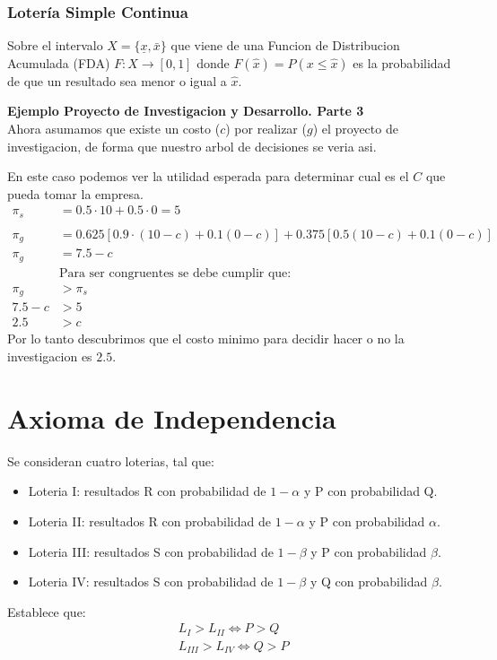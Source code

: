 \documentclass[12pt]{article}
\begin{document}
\subsubsection{Lotería Simple Continua}
Sobre el intervalo $X=\{ {{\underline{x}},\bar{x}}\}$ que viene de una Funcion de Distribucion Acumulada (FDA) $F:X\rightarrow[0,1]$ donde $F(\hat{x})=P(x \leq \hat{x})$ es la probabilidad de que un resultado sea menor o igual a $\hat{x}$. 
\begin{ejemplo}
    \textbf{Ejemplo Proyecto de Investigacion y Desarrollo. Parte 3}\\
    Ahora asumamos que existe un costo ($c$) por realizar ($g$) el proyecto de investigacion, de forma que nuestro arbol de decisiones se veria asi. 
     \begin{figure} [H]
        \centering
        
        \label{fig:placeholder}
    \end{figure}
    En este caso podemos ver la utilidad esperada para determinar cual es el $C$ que pueda tomar la empresa. 
    \begin{align*}
        \pi_s&=0.5\cdot 10+0.5\cdot 0=5\\\\
        \pi_g&=0.625[0.9\cdot(10-c)+0.1(0-c)]+0.375[0.5(10-c)+0.1(0-c)]\\
        \pi_g&=7.5-c\\
        & \text{Para ser congruentes se debe cumplir que:} \\ \pi_g&>\pi_s \\ 7.5-c&>5 \\ 2.5&>c 
    \end{align*}
    Por lo tanto descubrimos que el costo minimo para decidir hacer o no la investigacion es $2.5$. 
\end{ejemplo}

\section{Axioma de Independencia}
Se consideran cuatro loterias, tal que: 
\begin{itemize}
    \item Loteria I: resultados R con probabilidad de $1-\alpha$ y P con probabilidad Q. 
    \item Loteria II: resultados R con probabilidad de $1-\alpha$ y P con probabilidad $\alpha$.
    \item Loteria III: resultados S con probabilidad de $1-\beta$ y P con probabilidad $\beta$. 
    \item Loteria IV: resultados S con probabilidad de $1-\beta$ y Q con probabilidad $\beta$. 
\end{itemize}
Establece que: 
\begin{align*}
    L_I>L_{II} \iff P>Q \\ 
    L_{III}>L_{IV} \iff Q>P
\end{align*}
\end{document}
